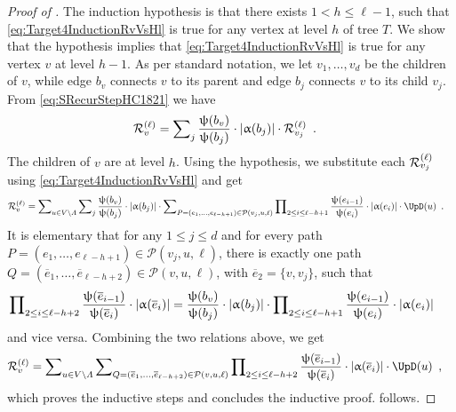 \documentclass[11pt,reqno]{amsart}
\numberwithin{equation}{section}
\newcommand{\cP}{{\mathcal{P}}}
\newcommand{\applegreen}[1]{ {\color{applegreen}#1}}
\newcommand{\amethyst}[1]{{\color{amethyst}#1} }
\newcommand{\blue}[1]{{\color{blue}#1}}
\newcommand{\capri}[1]{{\color{capri}#1}}
\newcommand{\cadmiumorange}[1]{{\color{cadmiumorange}#1}}
\newcommand{\coquelicot}[1]{{\color{coquelicot}#1}}
\newcommand{\deeppink}[1]{{\color{deeppink}#1}}
\newcommand{\electricviolet}[1]{{\color{electricviolet}#1}}
\newcommand{\goldenbrown}[1]{{\color{goldenbrown}#1}}
\newcommand{\red}[1]{{\color{red}#1}}
\newcommand{\abs}[1]{\blue{|}#1\blue{|}}
\renewcommand{\applegreen}[1]{#1}
\renewcommand{\amethyst}[1]{#1}
\renewcommand{\blue}[1]{#1}
\renewcommand{\capri}[1]{#1}
\renewcommand{\cadmiumorange}[1]{#1}
\renewcommand{\coquelicot}[1]{#1}
\renewcommand{\deeppink}[1]{#1}
\renewcommand{\electricviolet}[1]{#1}
\renewcommand{\goldenbrown}[1]{#1}
\renewcommand{\red}[1]{#1}
\newcommand{\kb}{\deeppink{b}}
\newcommand{\ke}{\blue{e}}
\newcommand{\kh}{\cadmiumorange{h}}
\newcommand{\ki}{\capri{i}}
\newcommand{\kj}{\coquelicot{j}}
\newcommand{\kell}{{\color{green(pigment)}\ell}}%
\newcommand{\kP}{\goldenbrown{P}}
\newcommand{\kQ}{\amethyst{Q}}
\newcommand{\ku}{\red{u}}
\newcommand{\kv}{\electricviolet{v}}
\renewcommand{\kb}{b}
\renewcommand{\ke}{e}
\renewcommand{\kh}{h}
\renewcommand{\ki}{i}
\renewcommand{\kj}{j}
\renewcommand{\kell}{\ell}
\renewcommand{\kP}{P}
\renewcommand{\kQ}{Q}
\renewcommand{\ku}{u}
\renewcommand{\kv}{v}
\newcommand{\infweight}{\upalpha}
\begin{document}
\begin{proof}[Proof of ]
The induction hypothesis is that there exists $1<\kh\leq \kell-1$, such that \eqref{eq:Target4InductionRvVsHl} 
is true for any vertex  at level $\kh$ of tree $T$. We show that the hypothesis implies that 
\eqref{eq:Target4InductionRvVsHl}  is true for any vertex $\kv$ at level $\kh-1$. 
As per standard notation, we let  $\kv_1, \ldots, \kv_d$  be the children of $\kv$, 
while edge $\kb_{\kv}$ connects $\kv$ to its parent and  edge $\kb_{\kj}$ connects
$\kv$ to its child $\kv_{\kj}$.  From \eqref{eq:SRecurStepHC1821} we have
%
\begin{align}
\subcont_{\kv} &= \sum\nolimits_{\kj} \frac{\chiofh(\kb_{\kv} )}{\chiofh(\kb_{\kj})}\cdot \abs{\infweight(\kb_{\kj})} \cdot \subcont_{\kv_{\kj}}  \enspace.  \nonumber
\end{align}
The children of $\kv$ are at level $\kh$. 
Using the  hypothesis, we substitute each $\subcont_{\kv_{\kj}}$  using \eqref{eq:Target4InductionRvVsHl} and get
% 
\begin{align}\nonumber
\subcont_{\kv}&= \sum\nolimits_{\ku\in V\setminus \Lambda} 
%
\sum\nolimits_{\kj} \frac{\chiofh(\kb_{\kv} )}{\chiofh(\kb_{\kj})}\cdot \abs{\infweight(\kb_{\kj})}\cdot 
\sum\nolimits_{\kP=(\ke_1,\ldots, \ke_{\kell-\kh+1})\in \cP(\kv_{\kj}, \ku, \kell)}
%
 \prod\nolimits_{2\leq \ki\leq \kell-h+1}
\frac{\chiofh(\ke_{\ki-1}) }{\chiofh(\ke_{\ki})} \cdot \abs{\infweight(\ke_{\ki})} \cdot \UpD(\ku) \enspace.
\end{align}
It is elementary  that  for any $1\leq \kj\leq d$ and for  every path $\kP=(\ke_1,\ldots, \ke_{\kell-\kh+1})\in \cP(\kv_{\kj}, \ku, \kell)$, 
there is exactly one path  $\kQ=(\overline{\ke}_1, \ldots, \overline{\ke}_{\kell-\kh+2})\in \cP(\kv,\ku,\kell)$,  with $\overline{\ke}_2=\{\kv,\kv_{\kj} \}$, 
such that 
\begin{align} \nonumber
 \prod\nolimits_{2\leq \ki\leq \kell-h+2}
\frac{\chiofh(\overline{\ke}_{\ki-1}) }{\chiofh(\overline{\ke}_{\ki})} \cdot \abs{\infweight(\overline{\ke}_{\ki})} &=
\frac{\chiofh(\kb_{\kv} )}{\chiofh(\kb_{\kj})}\cdot \abs{\infweight(\kb_{\kj})} \cdot \prod\nolimits_{2\leq \ki\leq \kell-\kh+1}
\frac{\chiofh(\ke_{\ki-1}) }{\chiofh(\ke_{\ki})} \cdot \abs{\infweight(\ke_{\ki})} \enspace
\end{align}
and vice versa.  Combining the two relations above, we get 
\begin{align}
\subcont_{\kv}&= \sum\nolimits_{\ku\in V\setminus \Lambda} 
%
\sum\nolimits_{\kQ=(\overline{\ke}_1,\ldots, \overline{\ke}_{\kell-\kh+2})\in \cP(\kv, \ku, \kell)}
% 
 \prod\nolimits_{2\leq \ki\leq \kell-\kh+2}
\frac{\chiofh(\overline{\ke}_{\ki-1}) }{\chiofh(\overline{\ke}_{\ki})} \cdot \abs{\infweight(\overline{\ke}_{\ki})} \cdot \UpD(\ku) \enspace, \nonumber %
\end{align}
which    proves the inductive steps and concludes the inductive proof. 
%
 follows. 
\end{proof}
 
\end{document}
